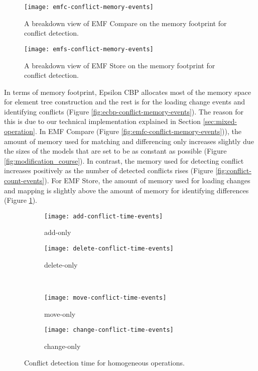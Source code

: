 \begin{figure}[ht]
  \begin{minipage}[b]{0.495\textwidth}
    \texttt{[image: emfc-conflict-memory-events]}
    \caption{A breakdown view of EMF Compare on the memory footprint for conflict detection.}
    \label{fig:emfc-conflict-memory-events}
  \end{minipage}
  \hfill
  \begin{minipage}[b]{0.495\textwidth}
    \texttt{[image: emfs-conflict-memory-events]}
    \caption{A breakdown view of EMF Store on the memory footprint for conflict detection.}
    \label{fig:emfs-conflict-memory-events}
  \end{minipage}
\end{figure}

In terms of memory footprint, Epsilon CBP allocates most of the memory space for element tree construction and the rest is for the loading change events and identifying conflicts (Figure \ref{fig:ecbp-conflict-memory-events}). The reason for this is due to our technical implementation explained in Section \ref{sec:mixed-operation}. In EMF Compare (Figure \ref{fig:emfc-conflict-memory-events})), the amount of memory used for matching and differencing only increases slightly due the sizes of the models that are set to be as constant as possible (Figure \ref{fig:modification_course}). In contrast, the memory used for detecting conflict increases positively as the number of detected conflicts rises (Figure \ref{fig:conflict-count-events}). For EMF Store, the amount of memory used for loading changes and mapping is slightly above the amount of memory for identifying differences (Figure \ref{fig:emfs-conflict-memory-events}).

\begin{figure*}[ht]
  \centering
  \begin{subfigure}[t]{0.495\linewidth}
    \texttt{[image: add-conflict-time-events]}
    \caption{add-only}
    \label{fig:add-conflict-time-events}
  \end{subfigure}
  \hfill
  \begin{subfigure}[t]{0.495\linewidth}
    \texttt{[image: delete-conflict-time-events]}
    \caption{delete-only}
    \label{fig:delete-conflict-time-events}
  \end{subfigure}
  \\
  \begin{subfigure}[t]{0.495\linewidth}
    \texttt{[image: move-conflict-time-events]}
    \caption{move-only}
    \label{fig:move-conflict-time-events}
  \end{subfigure}
  \hfill
  \begin{subfigure}[t]{0.495\linewidth}
    \texttt{[image: change-conflict-time-events]}
    \caption{change-only}
    \label{fig:change-conflict-time-events}
  \end{subfigure}
  \caption{Conflict detection time for homogeneous operations.}
  \label{fig:homgeneous_operation_time_events}
\end{figure*}

